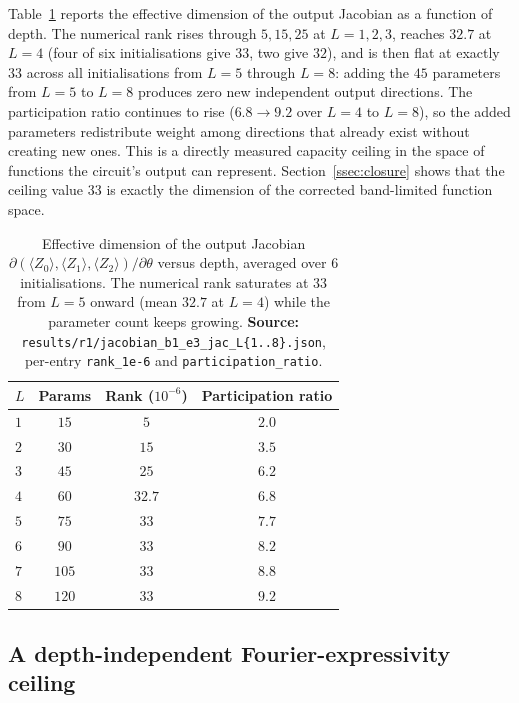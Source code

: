 \documentclass[a4paper,12pt]{iopart}
\newcommand{\Zexp}[1]{\langle Z_{#1}\rangle}
\begin{document}
Table~\ref{tab:jacobian} reports the effective dimension of the output Jacobian
as a function of depth. The numerical rank rises through $5,15,25$ at
$L=1,2,3$, reaches $32.7$ at $L=4$ (four of six initialisations give $33$, two
give $32$), and is then flat at exactly $33$ across all initialisations from
$L=5$ through $L=8$: adding the $45$ parameters from $L=5$ to $L=8$ produces zero
new independent output directions. The participation ratio continues to rise
($6.8\to9.2$ over $L=4$ to $L=8$), so the added parameters redistribute weight
among directions that already exist without creating new ones. This is a
directly measured capacity ceiling in the space of functions the circuit's
output can represent. Section~\ref{ssec:closure} shows that the ceiling value
$33$ is exactly the dimension of the corrected band-limited function space.

\begin{table}[htbp]
  \centering
  \caption{Effective dimension of the output Jacobian
    $\partial(\Zexp{0},\Zexp{1},\Zexp{2})/\partial\theta$ versus depth, averaged
    over $6$ initialisations. The numerical rank saturates at $33$ from $L=5$
    onward (mean $32.7$ at $L=4$) while the parameter count keeps growing.
    \textbf{Source:} \texttt{results/r1/jacobian\_b1\_e3\_jac\_L\{1..8\}.json},
    per-entry \texttt{rank\_1e-6} and \texttt{participation\_ratio}.}
  \label{tab:jacobian}
  \begin{tabular}{lccc}
    \toprule
    $L$ & Params & Rank ($10^{-6}$) & Participation ratio \\
    \midrule
    $1$ & $15$  & $5$    & $2.0$ \\
    $2$ & $30$  & $15$   & $3.5$ \\
    $3$ & $45$  & $25$   & $6.2$ \\
    $4$ & $60$  & $32.7$ & $6.8$ \\
    $5$ & $75$  & $33$   & $7.7$ \\
    $6$ & $90$  & $33$   & $8.2$ \\
    $7$ & $105$ & $33$   & $8.8$ \\
    $8$ & $120$ & $33$   & $9.2$ \\
    \bottomrule
  \end{tabular}
\end{table}

\subsection{A depth-independent Fourier-expressivity ceiling}
\label{ssec:fourier}
\end{document}
